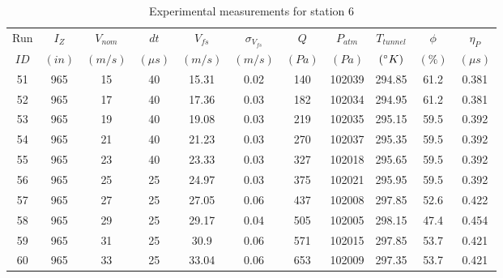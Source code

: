 \renewcommand\baselinestretch{1.3}\selectfont
\begin{table}[H]
\begin{center}
\begin{tabular}{|ccccccccccc|}
	\hline
	Run & $I_Z$ & $V_{nom}$ & $dt$ & $V_{fs}$ & $\sigma_{V_{fs}}$ & $Q$ & $P_{atm}$ & $T_{tunnel}$ & $\phi$ & $\eta_P$\\
	$ID$ & $(in)$ & $(m/s)$ & $(\mu s)$ & $(m/s)$ & $(m/s)$ & $(Pa)$ & $(Pa)$ & $(\degree K)$ & $(\%)$ & $(\mu s)$\\
	\hline
	51 & 965 & 15 & 40 & 15.31 & 0.02 & 140 & 102039 & 294.85 & 61.2 & 0.381\\
	52 & 965 & 17 & 40 & 17.36 & 0.03 & 182 & 102034 & 294.95 & 61.2 & 0.381\\
	53 & 965 & 19 & 40 & 19.08 & 0.03 & 219 & 102035 & 295.15 & 59.5 & 0.392\\
	54 & 965 & 21 & 40 & 21.23 & 0.03 & 270 & 102037 & 295.35 & 59.5 & 0.392\\
	55 & 965 & 23 & 40 & 23.33 & 0.03 & 327 & 102018 & 295.65 & 59.5 & 0.392\\
	56 & 965 & 25 & 25 & 24.97 & 0.03 & 375 & 102021 & 295.95 & 59.5 & 0.392\\
	57 & 965 & 27 & 25 & 27.05 & 0.06 & 437 & 102008 & 297.85 & 52.6 & 0.422\\
	58 & 965 & 29 & 25 & 29.17 & 0.04 & 505 & 102005 & 298.15 & 47.4 & 0.454\\
	59 & 965 & 31 & 25 & 30.9 & 0.06 & 571 & 102015 & 297.85 & 53.7 & 0.421\\
	60 & 965 & 33 & 25 & 33.04 & 0.06 & 653 & 102009 & 297.35 & 53.7 & 0.421\\
	\hline
\end{tabular}
\caption{Experimental measurements for station 6}
\label{table:station_6_measurements}
\end{center}
\end{table}
\renewcommand\baselinestretch{2}\selectfont
